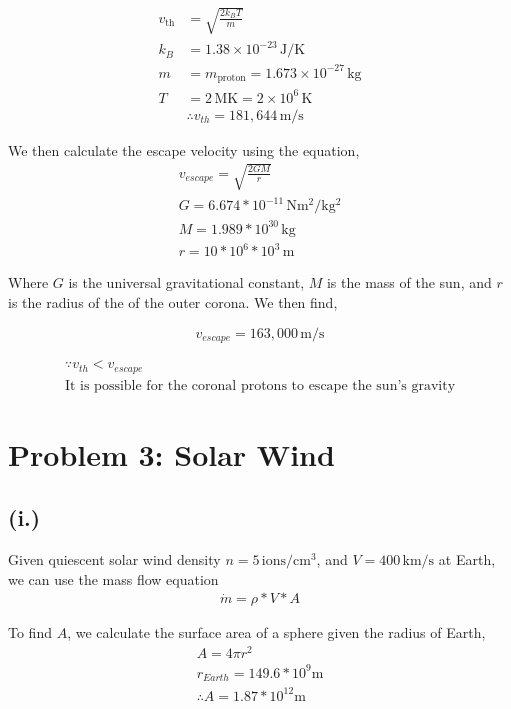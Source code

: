 \documentclass[11pt]{article}
\begin{document}
\[
\begin{aligned}
v_{\mathrm{th}} &= \sqrt{\frac{2k_B T}{m}} \\[4pt]
k_B &= 1.38 \times 10^{-23}\,\mathrm{J/K} \\[4pt]
m &= m_{\mathrm{proton}} = 1.673 \times 10^{-27}\,\mathrm{kg} \\[4pt]
T &= 2\,\mathrm{MK} = 2 \times 10^6\,\mathrm{K} \\
&\boxed{\therefore v_{th} = 181,644 \, \mathrm{m/s}}
\end{aligned}
\]

We then calculate the escape velocity using the equation,
\[
\begin{aligned}
v_{escape} = \sqrt{ \frac{2GM}{r} } \\
G = 6.674*10^{-11} \, \mathrm{Nm^2/kg^2} \\
M = 1.989*10^{30} \, \mathrm{kg} \\
r = 10*10^{6}*10^3 \, \mathrm{m}
\end{aligned}
\]

Where $G$ is the universal gravitational constant, $M$ is
the mass of the sun, and $r$ is the radius of the of the outer
corona. We then find,

\[
\boxed{v_{escape} = 163,000 \, \mathrm{m/s}}
\]

\[
\begin{gathered}
\because v_{th} < v_{escape} \\
\boxed{\text{It is possible for the coronal protons to escape the sun's gravity}}
\end{gathered}
\]

\section*{Problem 3: Solar Wind}

\subsection*{(i.)}

Given quiescent solar wind density $n = 5 \, \mathrm{ions/cm^3}$,
and $V = 400 \, \mathrm{km/s}$ at Earth, we can use the mass flow equation
\[
\begin{gathered}
    \dot{m} =\rho*V*A
\end{gathered}
\]

To find $A$, we calculate the surface area of a sphere given the radius of Earth,
\[
\begin{gathered}
    A = 4 \pi r^2 \\
    r_{Earth} = 149.6*10^9\mathrm{m} \\
    \therefore A = 1.87*10^{12} \mathrm{m}
\end{gathered}
\]
\end{document}
